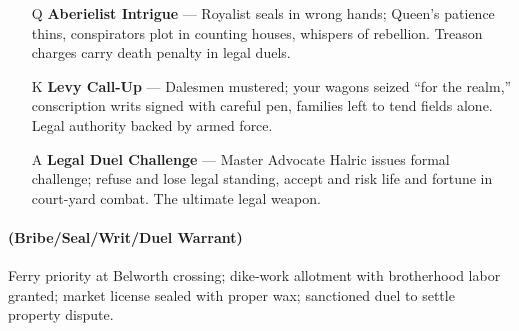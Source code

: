 \begin{enumerate}
\item[Q] \textbf{Aberielist Intrigue} --- Royalist seals in wrong hands; Queen's patience thins, conspirators plot in counting houses, whispers of rebellion. Treason charges carry death penalty in legal duels.
\item[K] \textbf{Levy Call-Up} --- Dalesmen mustered; your wagons seized ``for the realm,'' conscription writs signed with careful pen, families left to tend fields alone. Legal authority backed by armed force.
\item[A] \textbf{Legal Duel Challenge} --- Master Advocate Halric issues formal challenge; refuse and lose legal standing, accept and risk life and fortune in court-yard combat. The ultimate legal weapon.
\end{enumerate}

\paragraph*{(Bribe/Seal/Writ/Duel Warrant)} Ferry priority at Belworth crossing; dike-work allotment with brotherhood labor granted; market license sealed with proper wax; sanctioned duel to settle property dispute.

